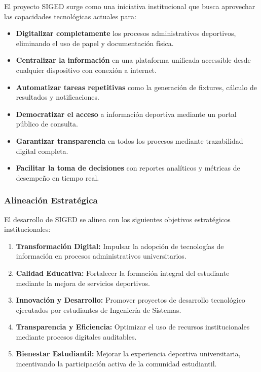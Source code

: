 \documentclass[12pt,a4paper]{article}
\begin{document}
El proyecto SIGED surge como una iniciativa institucional que busca aprovechar las capacidades tecnológicas actuales para:

\begin{itemize}[noitemsep]
    \item \textbf{Digitalizar completamente} los procesos administrativos deportivos, eliminando el uso de papel y documentación física.
    \item \textbf{Centralizar la información} en una plataforma unificada accessible desde cualquier dispositivo con conexión a internet.
    \item \textbf{Automatizar tareas repetitivas} como la generación de fixtures, cálculo de resultados y notificaciones.
    \item \textbf{Democratizar el acceso} a información deportiva mediante un portal público de consulta.
    \item \textbf{Garantizar transparencia} en todos los procesos mediante trazabilidad digital completa.
    \item \textbf{Facilitar la toma de decisiones} con reportes analíticos y métricas de desempeño en tiempo real.
\end{itemize}

\subsubsection{Alineación Estratégica}

El desarrollo de SIGED se alinea con los siguientes objetivos estratégicos institucionales:

\begin{enumerate}[noitemsep]
    \item \textbf{Transformación Digital:} Impulsar la adopción de tecnologías de información en procesos administrativos universitarios.
    \item \textbf{Calidad Educativa:} Fortalecer la formación integral del estudiante mediante la mejora de servicios deportivos.
    \item \textbf{Innovación y Desarrollo:} Promover proyectos de desarrollo tecnológico ejecutados por estudiantes de Ingeniería de Sistemas.
    \item \textbf{Transparencia y Eficiencia:} Optimizar el uso de recursos institucionales mediante procesos digitales auditables.
    \item \textbf{Bienestar Estudiantil:} Mejorar la experiencia deportiva universitaria, incentivando la participación activa de la comunidad estudiantil.
\end{enumerate}
\end{document}
